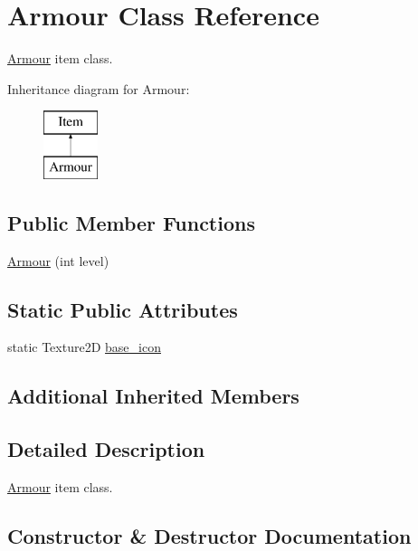 \hypertarget{class_armour}{}\section{Armour Class Reference}
\label{class_armour}


\mbox{\hyperlink{class_armour}{Armour}} item class.  


Inheritance diagram for Armour\+:\begin{figure}[H]
\begin{center}
\leavevmode
\includegraphics[height=2.000000cm]{class_armour}
\end{center}
\end{figure}
\subsection*{Public Member Functions}
\begin{DoxyCompactItemize}
\item 
\mbox{\hyperlink{class_armour_a8e1de059e6735d359e21f097deb9780a}{Armour}} (int level)
\end{DoxyCompactItemize}
\subsection*{Static Public Attributes}
\begin{DoxyCompactItemize}
\item 
static Texture2D \mbox{\hyperlink{class_armour_a13dbc37ca412b07302c3eb15b48059e2}{base\+\_\+icon}}
\end{DoxyCompactItemize}
\subsection*{Additional Inherited Members}


\subsection{Detailed Description}
\mbox{\hyperlink{class_armour}{Armour}} item class. 

\subsection{Constructor \& Destructor Documentation}
\mbox{\label{class_armour_a8e1de059e6735d359e21f097deb9780a}} 
